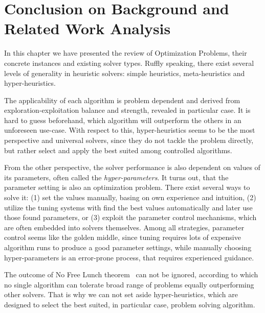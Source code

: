 \section{Conclusion on Background and Related Work Analysis}\label{bg: conclusion}
In this chapter we have presented the review of Optimization Problems, their concrete instances and existing solver types.
Ruffly speaking, there exist several levels of generality in heuristic solvers: simple heuristics, meta-heuristics and hyper-heuristics.

The applicability of each algorithm is problem dependent and derived from exploration-exploitation balance and strength, revealed in particular case.
It is hard to guess beforehand, which algorithm will outperform the others in an unforeseen use-case.
With respect to this, hyper-heuristics seems to be the most perspective and universal solvers, since they do not tackle the problem directly, but rather select and apply the best suited among controlled algorithms.

From the other perspective, the solver performance is also dependent on values of its parameters, often called the \textit{hyper-parameters}.
It turns out, that the parameter setting is also an optimization problem.
There exist several ways to solve it: (1) set the values manually, basing on own experience and intuition, (2) utilize the tuning systems with find the best values automatically and later use those found parameters, or (3) exploit the parameter control mechanisms, which are often embedded into solvers themselves. 
Among all strategies, parameter control seems like the golden middle, since tuning requires lots of expensive algorithm runs to produce a good parameter settings, while manually choosing hyper-parameters is an error-prone process, that requires experienced guidance.

The outcome of No Free Lunch theorem~\cite{wolpert1997no} can not be ignored, according to which no single algorithm can tolerate broad range of problems equally outperforming other solvers. That is why we can not set aside hyper-heuristics, which are designed to select the best suited, in particular case, problem solving algorithm.


